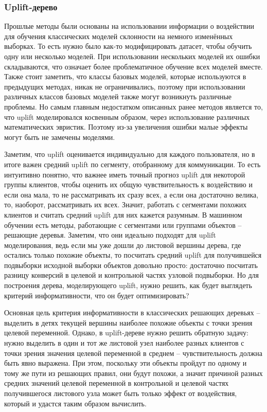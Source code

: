 \subsubsection*{Uplift-дерево}

Прошлые методы были основаны на использовании информации о воздействии для обучения классических моделей склонности на немного изменённых выборках. То есть нужно было как-то модифицировать датасет, чтобы обучить одну или несколько моделей. При использовании нескольких моделей их ошибки складываются, что означает более проблематичное обучение всех моделей вместе. Также стоит заметить, что классы базовых моделей, которые используются в предыдущих методах, никак не ограничивались, поэтому при использовании различных классов базовых моделей также могут возникнуть различные проблемы. Но самым главным недостатком описанных ранее методов является то, что uplift моделировался косвенным образом, через использование различных математических эвристик. Поэтому из-за увеличения ошибки малые эффекты могут быть не замечены моделями.

Заметим, что uplift оценивается индивидуально для каждого пользователя, но в итоге важен средний uplift по сегменту, отобранному для коммуникации. То есть интуитивно понятно, что важнее иметь точный прогноз uplift для некоторой группы клиентов, чтобы оценить их общую чувствительность к воздействию и если она мала, то не рассматривать их сразу всех, а если она достаточно велика, то, наоборот, рассматривать их всех. Значит, работать с сегментами похожих клиентов и считать средний uplift для них кажется разумным. В машинном обучении есть методы, работающие с сегментами или группами объектов -- решающие деревья. Заметим, что они идеально подходят для uplift моделирования, ведь если мы уже дошли до листовой вершины дерева, где остались только похожие объекты, то посчитать средний uplift для получившейся подвыборки исходной выборки объектов довольно просто: достаточно посчитать разницу конверсий в целевой и контрольной частях узловой подвыборки. Но для построения дерева, моделирующего uplift, нужно решить, как будет выглядеть критерий информативности, что он будет оптимизировать?

Основная цель критерия информативности в классических решающих деревьях -- выделить в детях текущей вершины наиболее похожие объекты с точки зрения целевой переменной. Однако, в uplift-дереве нужно решить обратную задачу: нужно выделить в один и тот же листовой узел наиболее разных клиентов с точки зрения значения целевой переменной в среднем -- чувствительность должна быть явно выражена. При этом, поскольку эти объекты пройдут по одному и тому же пути из решающих правил, они будут похожи, а значит причиной разных средних значений целевой переменной в контрольной и целевой частях получившегося листового узла может быть только эффект от воздействия, который и удастся таким образом вычислить.

